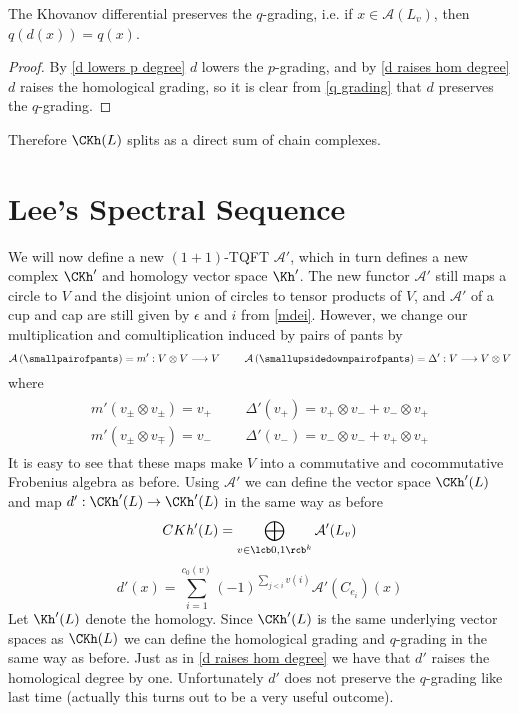 \begin{cor}
\label{d preserves q}
The Khovanov differential preserves the $q$-grading, i.e. if $x \in \mathcal A(L_v)$, then $q(d(x)) = q(x)$.
\end{cor}
\begin{proof}
By \ref{d lowers p degree} $d$ lowers the $p$-grading, and by \ref{d raises hom degree} $d$ raises the homological grading, so it is clear from \eqref{q grading} that $d$ preserves the $q$-grading.
\end{proof}

Therefore $\CKh(L)$ splits as a direct sum of chain complexes.


\section{Lee's Spectral Sequence}


We will now define a new $(1+1)$-TQFT $\mathcal A'$, which in turn defines a new complex $\CKh'$ and homology vector space $\Kh'$. The new functor $\mathcal A'$ still maps a circle to $V$ and the disjoint union of circles to tensor products of $V$, and $\mathcal A'$ of a cup and cap are still given by $\epsilon$ and $i$ from \eqref{mdei}. However, we change our multiplication and comultiplication induced by pairs of pants by
\[
\mathcal A\left( \smallpairofpants \right) = m' : V \otimes V \longrightarrow V  \ \ \ \ \ \ \ \mathcal A \left( \smallupsidedownpairofpants \right) = \Delta' : V \longrightarrow V \otimes V 
\]
where
\begin{align}
\label{deformed md}
\begin{array}{lcclcclcclcc}
	m'(v_\pm \otimes v_\pm) = v_+ & & & \Delta'(v_+) = v_+ \otimes v_- + v_- \otimes v_+ \\
	m'(v_\pm \otimes v_\mp) = v_- & & & \Delta'(v_-) = v_- \otimes v_- + v_+ \otimes v_+
\end{array}
\end{align}
It is easy to see that these maps make $V$ into a commutative and cocommutative Frobenius algebra as before. Using $\mathcal A'$ we can define the vector space $\CKh'(L)$ and map $d' : \CKh'(L) \rightarrow \CKh'(L)$ in the same way as before
\[ CKh'(L) = \bigoplus_{v \in \lcb 0,1 \rcb^k} \mathcal A'(L_v) \]
\begin{equation}
\label{dprime}
d'(x) = \sum_{i=1}^{c_0(v)} (-1)^{\sum_{j<i} v(i)} \mathcal A'(C_{e_i})(x)
\end{equation}
Let $\Kh'(L)$ denote the homology. Since $\CKh'(L)$ is the same underlying vector spaces as $\CKh(L)$ we can define the homological grading and $q$-grading in the same way as before. Just as in \ref{d raises hom degree} we have that $d'$ raises the homological degree by one. Unfortunately $d'$ does not preserve the $q$-grading like last time (actually this turns out to be a very useful outcome). 

